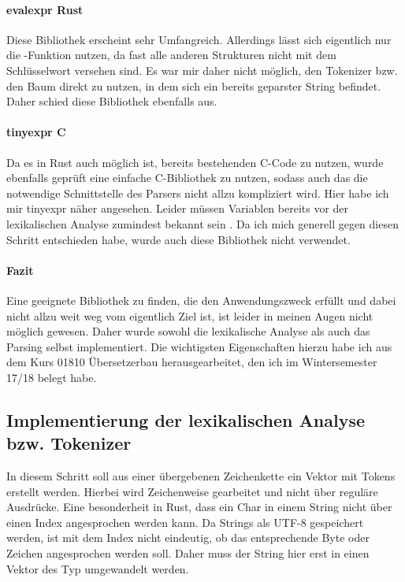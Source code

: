 \documentclass[11pt,a4paper, ngerman]{article}
\begin{document}
\paragraph{evalexpr Rust} \cite{CrateEvalexpr} Diese Bibliothek erscheint sehr Umfangreich. Allerdings lässt sich eigentlich nur die -Funktion nutzen, da fast alle anderen Strukturen nicht mit dem Schlüsselwort  versehen sind. Es war mir daher nicht möglich, den Tokenizer bzw. den Baum direkt zu nutzen, in dem sich ein bereits geparster String befindet. Daher schied diese Bibliothek ebenfalls aus.

\paragraph{tinyexpr C} \cite{CTinyexpr} Da es in Rust auch möglich ist, bereits bestehenden C-Code zu nutzen, wurde ebenfalls geprüft eine einfache C-Bibliothek zu nutzen, sodass auch das die notwendige Schnittstelle des Parsers nicht allzu kompliziert wird. Hier habe ich mir tinyexpr näher angesehen. Leider müssen Variablen bereits vor der lexikalischen Analyse zumindest bekannt sein \cite{CTinyexprReadme}. Da ich mich generell gegen diesen Schritt entschieden habe, wurde auch diese Bibliothek nicht verwendet.

\paragraph{Fazit} Eine geeignete Bibliothek zu finden, die den Anwendungszweck erfüllt und dabei nicht allzu weit weg vom eigentlich Ziel ist, ist leider in meinen Augen nicht möglich gewesen. Daher wurde sowohl die lexikalische Analyse als auch das Parsing selbst implementiert. Die wichtigsten Eigenschaften hierzu habe ich aus dem Kurs 01810 Übersetzerbau herausgearbeitet, den ich im Wintersemester 17/18 belegt habe.

\subsection{Implementierung der lexikalischen Analyse bzw. Tokenizer} In diesem Schritt soll aus einer übergebenen Zeichenkette ein Vektor mit Tokens erstellt werden. Hierbei wird Zeichenweise gearbeitet und nicht über reguläre Ausdrücke. Eine besonderheit in Rust, dass ein Char in einem String nicht über einen Index angesprochen werden kann. Da Strings als UTF-8 gespeichert werden, ist mit dem Index nicht eindeutig, ob das entsprechende Byte oder Zeichen angesprochen werden soll. Daher muss der String hier erst in einen Vektor des Typ  umgewandelt werden.
\end{document}
